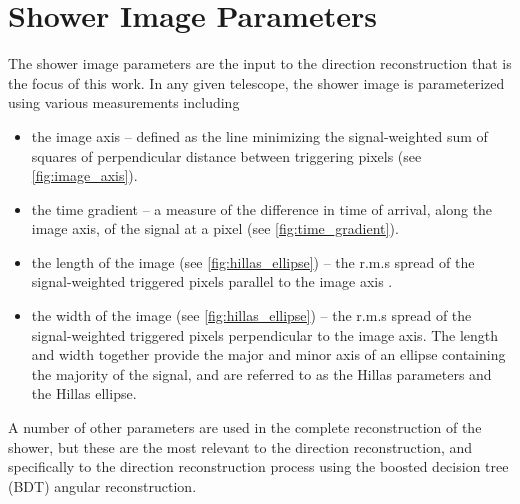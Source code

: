 \documentclass[main.tex]{subfiles}
\begin{document}
\section{Shower Image Parameters}
\label{shower-img-params}
The shower image parameters are the input to the direction reconstruction that is the focus of this work. In any given telescope, the shower image is parameterized using various measurements including
\begin{itemize}
\item the image axis -- defined as the line minimizing the signal-weighted sum of squares of perpendicular distance between triggering pixels (see \ref{fig:image_axis}).
\item the time gradient -- a measure of the difference in time of arrival, along the image axis, of the signal at a pixel (see \ref{fig:time_gradient}).
\item the length of the image (see \ref{fig:hillas_ellipse}) -- the r.m.s spread of the signal-weighted triggered pixels parallel to the image axis \cite{Hillas:1985}.
\item the width of the image (see \ref{fig:hillas_ellipse}) -- the r.m.s spread of the signal-weighted triggered pixels perpendicular to the image axis. The length and width together provide the major and minor axis of an ellipse containing the majority of the signal, and are referred to as the Hillas parameters and the Hillas ellipse.
\end{itemize}
A number of other parameters are used in the complete reconstruction of the shower, but these are the most relevant to the direction reconstruction, and specifically to the direction reconstruction process using the boosted decision tree (BDT) angular reconstruction.
\end{document}
